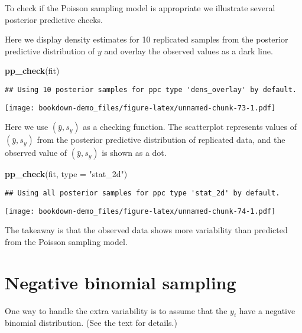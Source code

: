 \documentclass[
]{book}
\newenvironment{Shaded}{\begin{snugshade}}{\end{snugshade}}
\newcommand{\DataTypeTok}[1]{\textcolor[rgb]{0.13,0.29,0.53}{#1}}
\newcommand{\KeywordTok}[1]{\textcolor[rgb]{0.13,0.29,0.53}{\textbf{#1}}}
\newcommand{\NormalTok}[1]{#1}
\newcommand{\StringTok}[1]{\textcolor[rgb]{0.31,0.60,0.02}{#1}}
\begin{document}
To check if the Poisson sampling model is appropriate we illustrate several posterior predictive checks.

Here we display density estimates for 10 replicated samples from the posterior predictive distribution of \(y\) and overlay the observed values as a dark line.

\begin{Shaded}
\begin{Highlighting}[]
\KeywordTok{pp_check}\NormalTok{(fit)}
\end{Highlighting}
\end{Shaded}

\begin{verbatim}
## Using 10 posterior samples for ppc type 'dens_overlay' by default.
\end{verbatim}

\texttt{[image: bookdown-demo\_files/figure-latex/unnamed-chunk-73-1.pdf]}

Here we use \((\bar y, s_y)\) as a checking function. The scatterplot represents values of \((\bar y, s_y)\) from the posterior predictive distribution of replicated data, and the observed value of \((\bar y, s_y)\) is shown as a dot.

\begin{Shaded}
\begin{Highlighting}[]
\KeywordTok{pp_check}\NormalTok{(fit, }\DataTypeTok{type =} \StringTok{"stat_2d"}\NormalTok{)}
\end{Highlighting}
\end{Shaded}

\begin{verbatim}
## Using all posterior samples for ppc type 'stat_2d' by default.
\end{verbatim}

\texttt{[image: bookdown-demo\_files/figure-latex/unnamed-chunk-74-1.pdf]}

The takeaway is that the observed data shows more variability than predicted from the Poisson sampling model.

\hypertarget{negative-binomial-sampling}{%
\section{Negative binomial sampling}\label{negative-binomial-sampling}}

One way to handle the extra variability is to assume that the \(y_i\) have a negative binomial distribution. (See the text for details.)
\end{document}
